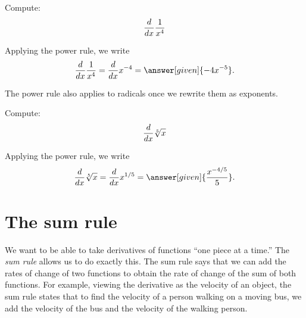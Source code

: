 \documentclass{ximera}
\begin{document}
\begin{example}
Compute:
\[
\frac{d}{\mathop{}\!d x} \frac{1}{x^4}
\]
\begin{explanation}
Applying the power rule, we write
\[
\ddx \frac{1}{x^4} = \ddx x^{-4} = \answer[given]{-4x^{-5}}.
\]
\end{explanation}
\end{example}

The power rule also applies to radicals once we rewrite them as exponents.

\begin{example}
Compute:
\[
\frac{d}{\mathop{}\!d x} \sqrt[5]{x}
\]
\begin{explanation}
Applying the power rule, we write
\[
\ddx \sqrt[5]{x} = \ddx x^{1/5} = \answer[given]{\frac{x^{-4/5}}{5}}.
\]
\end{explanation}
\end{example}






\section{The sum rule}

We want to be able to take derivatives of functions ``one piece at a
time.'' The \textit{sum rule} allows us to do exactly this. The sum rule says
that we can add the rates of change of two functions to obtain the
rate of change of the sum of both functions. For example, viewing the
derivative as the velocity of an object, the sum rule states that to find the
velocity of a person walking on a moving bus, we add the
velocity of the bus and the velocity of the walking person.
\end{document}
